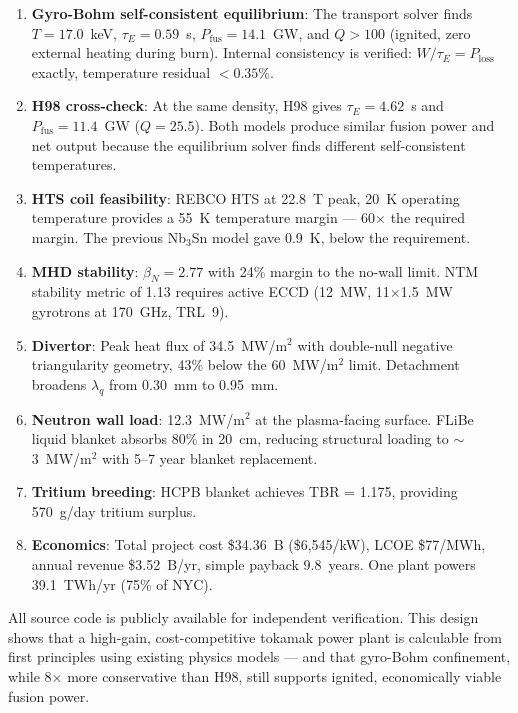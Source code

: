 \documentclass[11pt,a4paper]{article}
\begin{document}
\begin{enumerate}[nosep]
    \item \textbf{Gyro-Bohm self-consistent equilibrium}: The transport solver finds $T = 17.0$~keV, $\tau_E = 0.59$~s, $P_{\text{fus}} = 14.1$~GW, and $Q > 100$ (ignited, zero external heating during burn). Internal consistency is verified: $W/\tau_E = P_{\text{loss}}$ exactly, temperature residual $< 0.35\%$.
    \item \textbf{H98 cross-check}: At the same density, H98 gives $\tau_E = 4.62$~s and $P_{\text{fus}} = 11.4$~GW ($Q = 25.5$). Both models produce similar fusion power and net output because the equilibrium solver finds different self-consistent temperatures.
    \item \textbf{HTS coil feasibility}: REBCO HTS at 22.8~T peak, 20~K operating temperature provides a 55~K temperature margin --- 60$\times$ the required margin. The previous Nb$_3$Sn model gave 0.9~K, below the requirement.
    \item \textbf{MHD stability}: $\beta_N = 2.77$ with 24\% margin to the no-wall limit. NTM stability metric of 1.13 requires active ECCD (12~MW, 11$\times$1.5~MW gyrotrons at 170~GHz, TRL~9).
    \item \textbf{Divertor}: Peak heat flux of 34.5~MW/m$^2$ with double-null negative triangularity geometry, 43\% below the 60~MW/m$^2$ limit. Detachment broadens $\lambda_q$ from 0.30~mm to 0.95~mm.
    \item \textbf{Neutron wall load}: 12.3~MW/m$^2$ at the plasma-facing surface. FLiBe liquid blanket absorbs 80\% in 20~cm, reducing structural loading to $\sim$3~MW/m$^2$ with 5--7 year blanket replacement.
    \item \textbf{Tritium breeding}: HCPB blanket achieves TBR = 1.175, providing 570~g/day tritium surplus.
    \item \textbf{Economics}: Total project cost \$34.36~B (\$6,545/kW), LCOE \$77/MWh, annual revenue \$3.52~B/yr, simple payback 9.8~years. One plant powers 39.1~TWh/yr (75\% of NYC).
\end{enumerate}

All source code is publicly available for independent verification. This design shows that a high-gain, cost-competitive tokamak power plant is calculable from first principles using existing physics models --- and that gyro-Bohm confinement, while 8$\times$ more conservative than H98, still supports ignited, economically viable fusion power.
\end{document}
